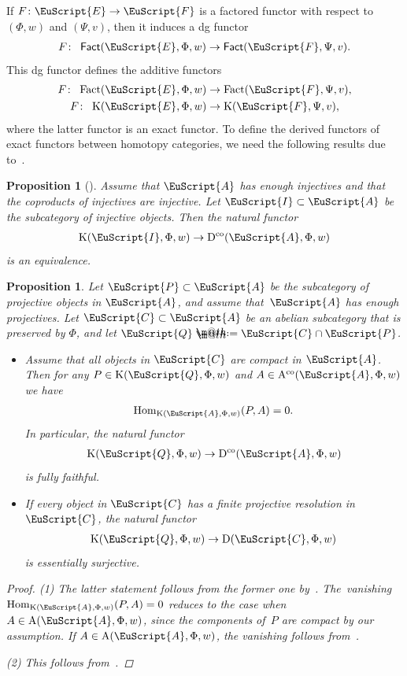 \documentclass[10pt,a4paper]{amsart}
\makeatletter
\newtheorem{prop}[dfn]{Proposition}
\newcommand*{\defeq}{\mathrel{\rlap{%
 \raisebox{0.3ex}{$\m@th\cdot$}}%
 \raisebox{-0.3ex}{$\m@th\cdot$}}%
 =}
\numberwithin{equation}{section}
\newcommand{\Fact}{\operatorname{Fact}}
\newcommand{\dgFact}{\operatorname{\sf{Fact}}}
\newcommand{\Hom}{\operatorname{Hom}}
\newcommand{\Dco}{\operatorname{D^{co}}}
\newcommand{\D}{\operatorname{D}}
\newcommand{\Aco}{\operatorname{A^{co}}}
\newcommand{\A}{\operatorname{A}}
\newcommand{\K}{\operatorname{K}}
\newcommand{\scrA}{\EuScript{A}}
\newcommand{\scrC}{\EuScript{C}}
\newcommand{\scrE}{\EuScript{E}}
\newcommand{\scrF}{\EuScript{F}}
\newcommand{\scrI}{\EuScript{I}}
\newcommand{\scrP}{\EuScript{P}}
\newcommand{\scrQ}{\EuScript{Q}}
\makeatother
\begin{document}
If $F\colon \scrE \to \scrF$ is a factored functor with respect to $(\Phi,w)$ and $(\Psi,v)$, then it induces a dg functor
\begin{gather*}
F\colon\ \dgFact(\scrE,\Phi,w)\to\dgFact(\scrF,\Psi,v).
\end{gather*}
This dg functor defines the additive functors
\begin{gather*}
F\colon\ \Fact(\scrE,\Phi,w)\to\Fact(\scrF,\Psi,v),
\\
F\colon\ \K(\scrE,\Phi,w)\to\K(\scrF,\Psi,v),
\end{gather*}
where the latter functor is an exact functor. To define the derived functors of exact functors between homotopy categories, we need the following results due to~\cite{bdfik}.

\begin{prop}[{\cite[Corollary~2.25]{bdfik}}]\label{inj resol}
Assume that $\scrA$ has enough injectives and that the coproducts of injectives are injective. Let $\scrI\subset \scrA$ be the subcategory of injective objects. Then the natural functor
\begin{gather*}
\K(\scrI,\Phi,w)\to\Dco(\scrA,\Phi,w)
\end{gather*}
is an equivalence.
\end{prop}

\begin{prop}\label{proj resol}
Let $\scrP\subset \scrA$ be the subcategory of projective objects in $\scrA$, and assume that~$\scrA$ has enough projectives. Let $\scrC\subset \scrA$ be an abelian subcategory that is preserved by $\Phi$, and let $\scrQ\defeq\scrC\cap \scrP$.
\begin{itemize}\itemsep=0pt
\item[$1.$] Assume that all objects in $\scrC$ are compact in $\scrA$. Then for any $P\in \K(\scrQ,\Phi,w)$ and $A\in \Aco(\scrA,\Phi,w)$ we have
\begin{gather*}
\Hom_{\K(\scrA,\Phi,w)}(P,A)=0.
\end{gather*}
In particular,
the natural functor
\begin{gather*}
\K(\scrQ,\Phi,w)\to\Dco(\scrA,\Phi,w)
\end{gather*}
is fully faithful.

\item[$2.$] If every object in $\scrC$ has a finite projective resolution in $\scrC$, the natural functor
\begin{gather*}
\K(\scrQ,\Phi,w)\to\D(\scrC,\Phi,w)
\end{gather*}
is essentially surjective.
\end{itemize}
\begin{proof}
(1) The latter statement follows from the former one by~\cite[Proposition~B.2]{ls}. The~vani\-shing $\Hom_{\K(\scrA,\Phi,w)}(P,A)=0$ reduces to the case when $A\in \A(\scrA,\Phi,w)$, since the components of~$P$ are compact by our assumption. If $A\in \A(\scrA,\Phi,w)$, the vanishing follows from~\cite[Lemma~2.4]{bdfik}.

(2) This follows from~\cite[Proposition~2.22]{bdfik}.
\end{proof}
\end{prop}
\end{document}
